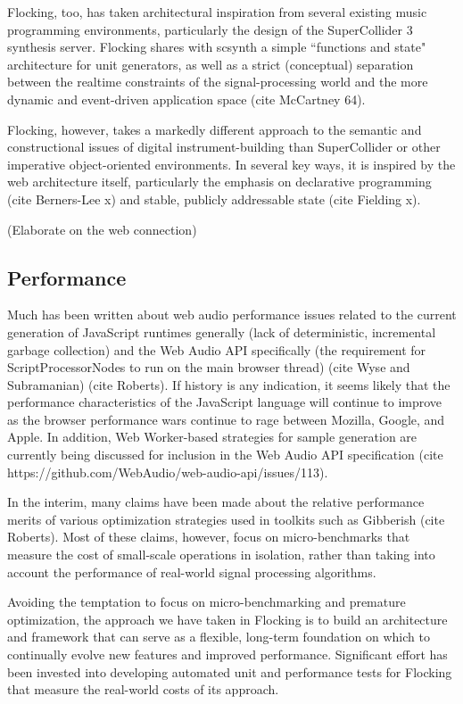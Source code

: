 \documentclass{article}
\begin{document}
Flocking, too, has taken architectural inspiration from several existing music programming environments, particularly the design of the SuperCollider 3 synthesis server. Flocking shares with scsynth a simple ``functions and state" architecture for unit generators, as well as a strict (conceptual) separation between the realtime constraints of the signal-processing world and the more dynamic and event-driven application space (cite McCartney 64).

Flocking, however, takes a markedly different approach to the semantic and constructional issues of digital instrument-building than SuperCollider or other imperative object-oriented environments. In several key ways, it is inspired by the web architecture itself, particularly the emphasis on declarative programming (cite Berners-Lee x) and stable, publicly addressable state (cite Fielding x).

(Elaborate on the web connection)

\subsection{Performance}

Much has been written about web audio performance issues related to the current generation of JavaScript runtimes generally (lack of deterministic, incremental garbage collection) and the Web Audio API specifically (the requirement for ScriptProcessorNodes to run on the main browser thread) (cite Wyse and Subramanian) (cite Roberts). If history is any indication, it seems likely that the performance characteristics of the JavaScript language will continue to improve as the browser performance wars continue to rage between Mozilla, Google, and Apple. In addition, Web Worker-based strategies for sample generation are currently being discussed for inclusion in the Web Audio API specification (cite https://github.com/WebAudio/web-audio-api/issues/113).

In the interim, many claims have been made about the relative performance merits of various optimization strategies used in toolkits such as Gibberish (cite Roberts). Most of these claims, however, focus on micro-benchmarks that measure the cost of small-scale operations in isolation, rather than taking into account the performance of real-world signal processing algorithms.

Avoiding the temptation to focus on micro-benchmarking and premature optimization, the approach we have taken in Flocking is to build an architecture and framework that can serve as a flexible, long-term foundation on which to continually evolve new features and improved performance. Significant effort has been invested into developing automated unit and performance tests for Flocking that measure the real-world costs of its approach.
\end{document}
